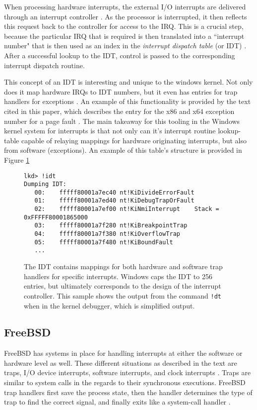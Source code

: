 \documentclass[10pt,draftclsnofoot,onecolumn]{IEEEtran}
\begin{document}
\par When processing hardware interrupts, the external I/O interrupts are delivered through an interrupt controller \cite{win:1}.
As the processor is interrupted, it then reflects this request back to the controller for access to the IRQ.
This is a crucial step, because the particular IRQ that is required is then translated into a ``interrupt number" that is then used as an index in the \textit{interrupt dispatch table} (or IDT) \cite{win:1}.
After a successful lookup to the IDT, control is passed to the corresponding interrupt dispatch routine.

\par This concept of an IDT is interesting and unique to the windows kernel.
Not only does it map hardware IRQs to IDT numbers, but it even has entries for trap handlers for exceptions \cite{win:1}.
An example of this functionality is provided by the text cited in this paper, which describes the entry for the x86 and x64 exception number for a page fault \cite{win:1}.
The main takeaway for this tooling in the Windows kernel system for interrupts is that not only can it's interrupt routine lookup-table capable of relaying mappings for hardware originating interrupts, but also from software (exceptions).
An example of this table's structure is provided in Figure \ref{code:idt_sample}

\begin{figure}[h]
\begin{lstlisting}
lkd> !idt
Dumping IDT:
   00:    fffff80001a7ec40 nt!KiDivideErrorFault
   01:    fffff80001a7ed40 nt!KiDebugTrapOrFault
   02:    fffff80001a7ef00 nt!KiNmiInterrupt    Stack = 0xFFFFF80001865000
   03:    fffff80001a7f280 nt!KiBreakpointTrap
   04:    fffff80001a7f380 nt!KiOverflowTrap
   05:    fffff80001a7f480 nt!KiBoundFault
   ...
\end{lstlisting}
\centering
\captionsetup{justification=centering}
\caption{
  The IDT contains mappings for both hardware and software trap handlers for specific interrupts.
  Windows caps the IDT to 256 entries, but ultimately corresponds to the design of the interrupt controller.
  This sample shows the output from the command \texttt{!dt} when in the kernel debugger, which is simplified output.
}
\label{code:idt_sample}
\end{figure}

\subsection{FreeBSD}
\label{sub:Interrupts FreeBSD}
\par FreeBSD has systems in place for handling interrupts at either the software or hardware level as well.
These different situations as described in the text are traps, I/O device interrupts, software interrupts, and clock interrupts \cite{bsd:1}.
Traps are similar to system calls in the regards to their synchronous executions.
FreeBSD trap handlers first save the process state, then the handler determines the type of trap to find the correct signal, and finally exits like a system-call handler \cite{bsd:1}.
\end{document}
